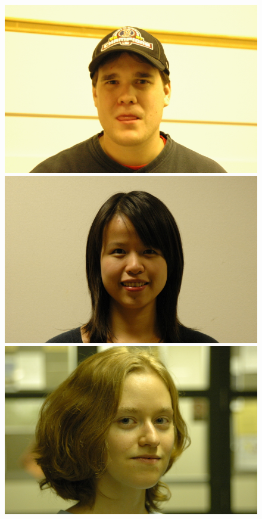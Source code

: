 \begin{figure}
\includegraphics[scale=0.35,clip=true]{figures_cvpr/examples/4/failure/DSC_1578.jpg} 
\includegraphics[scale=0.35,clip=true]{figures_cvpr/examples/4/failure/DSC_1500.jpg} 
\includegraphics[scale=0.35,clip=true]{figures_cvpr/examples/4/failure/DSC_1930.jpg} 

\end{figure}
